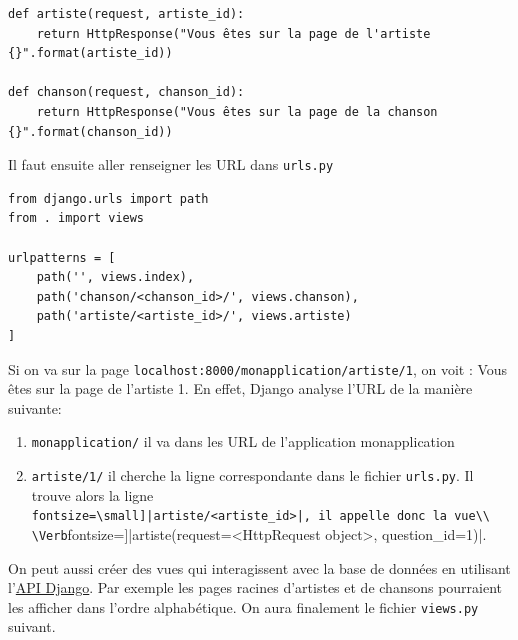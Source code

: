 \documentclass[a4paper, 10pt]{article}
\newcommand{\code}[1]{{\small\texttt{#1}}}
\begin{document}
\begin{verbatim}
def artiste(request, artiste_id):
    return HttpResponse("Vous êtes sur la page de l'artiste {}".format(artiste_id))

def chanson(request, chanson_id):
    return HttpResponse("Vous êtes sur la page de la chanson {}".format(chanson_id))
\end{verbatim}

Il faut ensuite aller renseigner les URL dans \code{urls.py}
\begin{verbatim}
from django.urls import path
from . import views

urlpatterns = [
    path('', views.index),
    path('chanson/<chanson_id>/', views.chanson),
    path('artiste/<artiste_id>/', views.artiste)
]
\end{verbatim}

Si on va sur la page \code{localhost:8000/monapplication/artiste/1}, on voit : \og Vous êtes sur la page de l'artiste 1\fg{}. En effet, Django analyse l'URL de la manière suivante:
\begin{enumerate}
    \item \code{monapplication/} il va dans les URL de l’application monapplication
    \item \code{artiste/1/} il cherche la ligne correspondante dans le fichier \code{urls.py}. Il trouve alors la ligne\\ \Verb[fontsize=\small]|artiste/<artiste_id>|, il appelle donc la vue\\ \Verb[fontsize=\small]|artiste(request=<HttpRequest object>, question_id=1)|.
\end{enumerate}

On peut aussi créer des vues qui interagissent avec la base de données en utilisant l'\href{https://docs.djangoproject.com/fr/2.0/topics/db/queries/}{API Django}. Par exemple les pages racines d'artistes et de chansons pourraient les afficher dans l'ordre alphabétique. On aura finalement le fichier \code{views.py} suivant.
\end{document}
